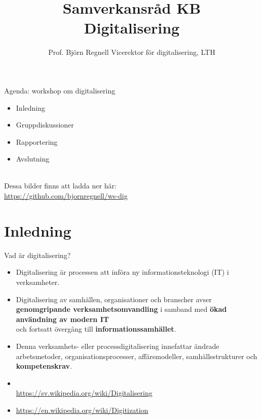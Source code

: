 \documentclass[aspectratio=169]{beamer}
\title[B. Regnell, \today]{\selectfont Samverkansråd KB\\ Digitalisering}
\author[\href{https://github.com/bjornregnell/ws-dig}{github.com/bjornregnell/ws-dig}]{%
  Prof. Björn Regnell\newline
  Vicerektor för digitalisering, LTH}
\newcommand{\TitleSlide}{\begin{frame}[plain]\titlepage\end{frame}}
\newenvironment{Slide}[1]%
  {\begin{frame}[environment=Slide]{#1}}
  {\end{frame}}%
\begin{document}
\TitleSlide


\begin{Slide}{Agenda: workshop om digitalisering}
\begin{itemize}
    \item Inledning 
    \item Gruppdiskussioner 
    \item Rapportering 
    \item Avslutning
\end{itemize}

~\\Dessa bilder finns att ladda ner här: \\ 
\url{https://github.com/bjornregnell/ws-dig}
\end{Slide}

\section{Inledning}

\begin{Slide}{Vad är digitalisering?}
  \begin{itemize}\small
      \item Digitalisering är processen att införa ny informationsteknologi (IT) i
      verksamheter. 
      \item Digitalisering av samhällen, organisationer och
      branscher avser \textbf{genomgripande verksamhetsomvandling} i samband
      med \textbf{ökad användning av modern IT} \\ och fortsatt övergång till
      \textbf{informationssamhället}. 
      
      \item Denna verksamhets- eller processdigitalisering innefattar ändrade arbetsmetoder,
      organisationsprocesser, affärsmodeller, samhällsstrukturer och
      \textbf{kompetenskrav}.
    \end{itemize}

    \begin{itemize}\small
      \item[]  ~\\\url{https://sv.wikipedia.org/wiki/Digitalisering}
      \item[]  \url{https://en.wikipedia.org/wiki/Digitization}
  \end{itemize}
\end{Slide}
\end{document}
